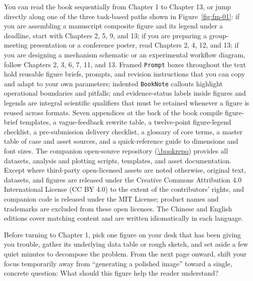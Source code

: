 You can read the book sequentially from Chapter 1 to Chapter 13, or jump directly along one of the three task-based paths shown in Figure~\ref{fig:fm-01}: if you are assembling a manuscript composite figure and its legend under a deadline, start with Chapters 2, 5, 9, and 13; if you are preparing a group-meeting presentation or a conference poster, read Chapters 2, 4, 12, and 13; if you are designing a mechanism schematic or an experimental workflow diagram, follow Chapters 2, 3, 6, 7, 11, and 13. Framed \texttt{Prompt} boxes throughout the text hold reusable figure briefs, prompts, and revision instructions that you can copy and adapt to your own parameters; indented \texttt{BookNote} callouts highlight operational boundaries and pitfalls; and evidence-status labels inside figures and legends are integral scientific qualifiers that must be retained whenever a figure is reused across formats. Seven appendices at the back of the book compile figure-brief templates, a vague-feedback rewrite table, a twelve-point figure-legend checklist, a pre-submission delivery checklist, a glossary of core terms, a master table of case and asset sources, and a quick-reference guide to dimensions and font sizes. The companion open-source repository (\url{\bookrepo}) provides all datasets, analysis and plotting scripts, templates, and asset documentation. Except where third-party open-licensed assets are noted otherwise, original text, datasets, and figures are released under the Creative Commons Attribution 4.0 International License (CC BY 4.0) to the extent of the contributors' rights, and companion code is released under the MIT License; product names and trademarks are excluded from these open licenses. The Chinese and English editions cover matching content and are written idiomatically in each language.

Before turning to Chapter 1, pick one figure on your desk that has been giving you trouble, gather its underlying data table or rough sketch, and set aside a few quiet minutes to decompose the problem. From the next page onward, shift your focus temporarily away from ``generating a polished image'' toward a single, concrete question: What should this figure help the reader understand?
